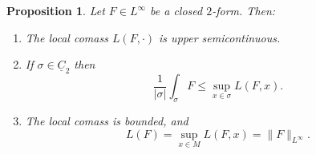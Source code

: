 \documentclass[reqno,11pt]{amsart}
\newcommand*\dif{\mathop{}\!\mathrm{d}}
\newcommand{\Chain}{\underline C}
\newtheorem{proposition}[theorem]{Proposition}
\theoremstyle{definition}
\numberwithin{equation}{section}
\begin{document}
\begin{proposition}\label{crandall}
Let $F \in L^\infty$ be a closed $2$-form. Then:
\begin{enumerate}
\item The local comass $L(F, \cdot)$ is upper semicontinuous. \label{crandall usc}
\item If $\sigma \in \Chain_2$ then \label{crandall best curl is ABC}
$$\frac{1}{|\sigma|} \int_\sigma F \leq \sup_{x \in \sigma} L(F, x).$$
\item The local comass is bounded, and \label{crandall linfinity}
$$L(F) = \sup_{x \in M} L(F, x) = \|F\|_{L^\infty}.$$
\end{enumerate}
\end{proposition}
\end{document}
